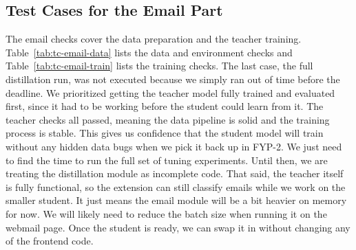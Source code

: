 \documentclass{FastFyp}
\begin{document}
\subsection{Test Cases for the Email Part}
\label{sec:test-email}
The email checks cover the data preparation and the teacher training. Table~\ref{tab:tc-email-data} lists the data and environment checks and Table~\ref{tab:tc-email-train} lists the training checks. The last case, the full distillation run, was not executed because we simply ran out of time before the deadline. We prioritized getting the teacher model fully trained and evaluated first, since it had to be working before the student could learn from it. The teacher checks all passed, meaning the data pipeline is solid and the training process is stable. This gives us confidence that the student model will train without any hidden data bugs when we pick it back up in FYP-2. We just need to find the time to run the full set of tuning experiments. Until then, we are treating the distillation module as incomplete code. That said, the teacher itself is fully functional, so the extension can still classify emails while we work on the smaller student. It just means the email module will be a bit heavier on memory for now. We will likely need to reduce the batch size when running it on the webmail page. Once the student is ready, we can swap it in without changing any of the frontend code.
\end{document}
